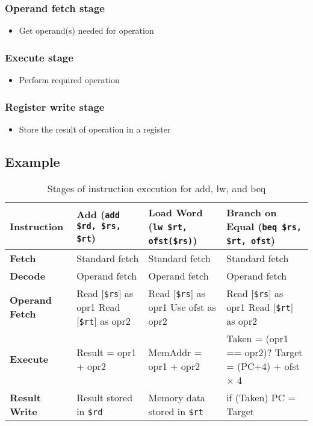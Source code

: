 \documentclass[12pt]{article}
\theoremstyle{definition}
\begin{document}
\subsubsection{Operand fetch stage}
\begin{itemize}
    \item Get operand(s) needed for operation
\end{itemize}
\subsubsection{Execute stage}
\begin{itemize}
    \item Perform required operation
\end{itemize}
\subsubsection{Register write stage}
\begin{itemize}
    \item Store the result of operation in a register
\end{itemize}
\subsection*{Example}
\begin{table}[htbp]
    \centering
    \begin{tabular}{|p{3cm}|p{4.5cm}|p{4.5cm}|p{4.5cm}|}
    \hline
    \textbf{Instruction} & \textbf{Add} (\texttt{add \$rd, \$rs, \$rt}) & \textbf{Load Word} (\texttt{lw \$rt, ofst(\$rs)}) & \textbf{Branch on Equal} (\texttt{beq \$rs, \$rt, ofst})\\
    \hline
    \textbf{Fetch} & Standard fetch & Standard fetch & Standard fetch \\
    \hline
    \textbf{Decode} & Operand fetch & Operand fetch & Operand fetch \\
    \hline
    \textbf{Operand Fetch} & 
    Read [\texttt{\$rs}] as opr1 \newline
    Read [\texttt{\$rt}] as opr2 &
    Read [\texttt{\$rs}] as opr1 \newline
    Use ofst as opr2 &
    Read [\texttt{\$rs}] as opr1 \newline
    Read [\texttt{\$rt}] as opr2 \\
    \hline
    \textbf{Execute} & Result = opr1 + opr2 & MemAddr = opr1 + opr2 & Taken = (opr1 == opr2)? \newline Target = (PC+4) + ofst $\times$ 4 \\
    \hline
    \textbf{Result Write} & Result stored in \texttt{\$rd} & Memory data stored in \texttt{\$rt} & if (Taken) \newline PC = Target \\
    \hline
    \end{tabular}
    \caption{Stages of instruction execution for add, lw, and beq}
    \end{table}
    \newpage
\end{document}
